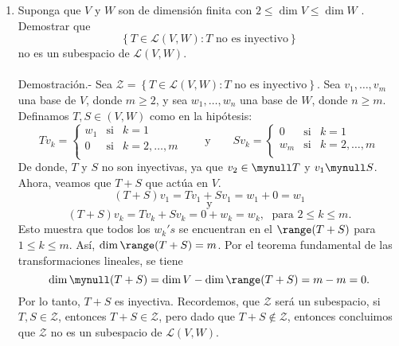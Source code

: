 \begin{enumerate}[\bfseries 1.]
    \item Suponga que $V$ y $W$ son de dimensión finita con $2\leq \dim V \leq \dim W$ . Demostrar que 
    $$\left\{T\in \mathcal{L}(V,W):T\mbox{ no es inyectivo}\right\}$$ 
    no es un subespacio de $\mathcal{L}(V,W)$.\\\\
    Demostración.-\; Sea $\mathcal{Z}=\left\{T\in \mathcal{L}(V,W):T\mbox{ no es inyectivo}\right\}$.  Sea $v_1,\ldots,v_m$ una base de $V$, donde $m\geq 2$, y sea $w_1,\ldots,w_n$ una base de $W$, donde $n\geq m$. Definamos $T,S\in \left(V,W\right)$ como en la hipótesis:
	$$
	Tv_k = 
	    \left\{
		\begin{array}{rcl}
		    w_1 &\mbox{si}& k=1\\
		    0 &\mbox{si}& k=2,\ldots, m\\
		\end{array}
	    \right.
	\qquad \mbox{y} \qquad
	Sv_k = 
	    \left\{
		\begin{array}{lcl}
		    0 &\mbox{si}& k=1\\
		    w_m &\mbox{si}& k=2,\ldots, m\\
		\end{array}
	    \right.
	$$
	De donde, $T$ y $S$ no son inyectivas, ya que $v_2\in \mynull T$ y $v_1\mynull S$. Ahora, veamos que $T+S$ que actúa en $V$.
	$$(T+S)v_1=Tv_1+Sv_1=w_1+0=w_1$$
	$$\mbox{y}$$
	$$(T+S)v_k = Tv_k+Sv_k=0+w_k=w_k,\; \mbox{ para }2\leq k \leq m.$$
	Esto muestra que todos los $w_k's$ se encuentran en el $\range (T+S)$ para $1\leq k \leq m$. Así, $\dim\range (T+S)=m$. Por el teorema fundamental de las transformaciones lineales, se tiene
	$$\dim\mynull(T+S)=\dim V-\dim \range(T+S)=m-m=0.$$
	Por lo tanto, $T+S$ es inyectiva. Recordemos, que $\mathcal{Z}$ será un subespacio, si $T,S\in \mathcal{Z}$, entonces $T+S\in \mathcal{Z}$, pero dado que $T+S\notin \mathcal{Z}$, entonces concluimos que $\mathcal{Z}$ no es un subespacio de $\mathcal{L}(V,W)$.\\\\


\end{enumerate}
